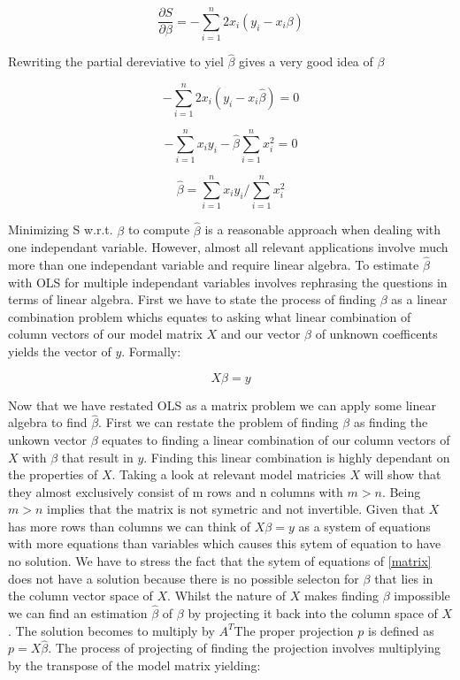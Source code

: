 \documentclass{article}
\begin{document}
    \begin{equation} \label{partialDer} \frac{\partial S}{\partial \beta} = - \sum_{i=1}^{n} 2x_i(y_i-x_i\beta) \end{equation}

    Rewriting the partial dereviative to yiel $\widehat{\beta}$ gives a very good idea of $\beta$

    \begin{equation}  - \sum_{i=1}^{n} 2x_i(y_i-x_i\widehat{\beta}) = 0  \end{equation}

    \begin{equation} - \sum_{i=1}^{n} x_iy_i-\widehat{\beta} \sum_{i=1}^{n} x_i^2 = 0  \end{equation}

    \begin{equation} \widehat{\beta} = \sum_{i=1}^{n} x_iy_i /\sum_{i=1}^{n} x_i^2 \end{equation}


    Minimizing S w.r.t. $\beta$ to compute $\widehat{\beta}$ is a reasonable approach when dealing with one independant variable. However, almost all relevant applications involve much more than one independant variable and require linear algebra. To estimate $\widehat{\beta}$ with OLS for multiple independant variables involves rephrasing the questions in terms of linear algebra. First we have to state the process of finding $\beta$ as a linear combination problem whichs equates to asking what linear combination of column vectors of our model matrix $X$ and our vector $\beta$ of unknown coefficents yields the vector of $y$. Formally:

    \begin{equation} \label{matrix} X\beta = y \end{equation}

    Now that we have restated OLS as a matrix problem we can apply some linear algebra to find $\widehat{\beta}$. First we can restate the problem of finding $\beta$ as finding the unkown vector $\beta$ equates to finding a linear combination of our column vectors of $X$ with $\beta$ that result in $y$. Finding this linear combination is highly dependant on the properties of $X$. Taking a look at relevant model matricies $X$ will show that they almost exclusively consist of m rows and n columns with $m > n$. Being $m > n$ implies that the matrix is not symetric and not invertible. Given that $X$ has more rows than columns we can think of $X\beta = y$ as a system of equations with more equations than variables which causes this sytem of equation to have no solution. We have to stress the fact that the sytem of equations of \ref{matrix} does not have a solution because there is no possible selecton for $\beta$ that lies in the column vector space of $X$. Whilst the nature of $X$ makes finding $\beta$ impossible we can find an estimation $\widehat{\beta}$ of $\beta$ by projecting it back into the column space of $X$.  The solution becomes to multiply by $A^T$The proper projection $p$ is defined as $p = X\widehat{\beta}$. The process of projecting of finding the projection involves multiplying by the transpose of the model matrix yielding:
\end{document}
